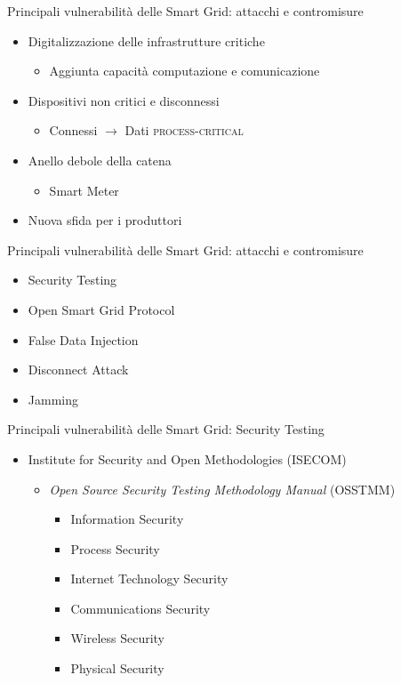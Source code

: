 

\begin{frame}{Principali vulnerabilità delle Smart Grid: attacchi e contromisure}
	\begin{itemize}[<+- | alert@+>]
		\item Digitalizzazione delle infrastrutture critiche
		\begin{itemize}
			\item Aggiunta capacità computazione e comunicazione
		\end{itemize}
		\item Dispositivi non critici e disconnessi
		\begin{itemize}
			\item Connessi $\rightarrow$ Dati \textsc{process-critical}
		\end{itemize}
		\item Anello debole della catena
		\begin{itemize}
			\item Smart Meter
		\end{itemize}
		\item Nuova sfida per i produttori
	\end{itemize}
\end{frame}

\begin{frame}{Principali vulnerabilità delle Smart Grid: attacchi e contromisure}
	\begin{itemize}[<+- | alert@+>]
		\item Security Testing
		\item Open Smart Grid Protocol
		\item False Data Injection
		\item Disconnect Attack
		\item Jamming
	\end{itemize}
\end{frame}


\begin{frame}{Principali vulnerabilità delle Smart Grid: Security Testing}
	\begin{itemize}[<+- | alert@+>]
		\item Institute for Security and Open Methodologies (ISECOM)
		\begin{itemize}
			\item \textit{Open Source Security Testing Methodology Manual} (OSSTMM)
			\begin{itemize}
				\item Information Security
				\item Process Security
				\item \alert<9>{Internet Technology Security}
				\item Communications Security
				\item Wireless Security
				\item Physical Security
			\end{itemize}
		\end{itemize}
	\end{itemize}
\end{frame}

